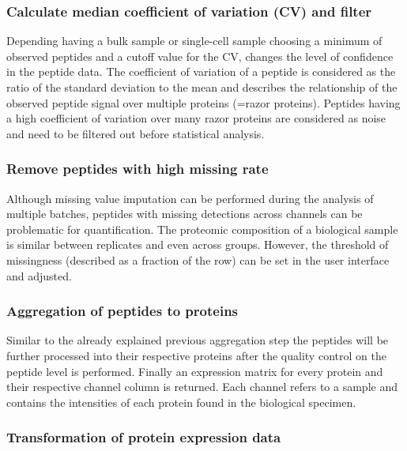 \documentclass[
  11pt,
]{article}
\begin{document}
\hypertarget{calculate-median-coefficient-of-variation-cv-and-filter}{%
\subsubsection{Calculate median coefficient of variation (CV) and
filter}\label{calculate-median-coefficient-of-variation-cv-and-filter}}

Depending having a bulk sample or single-cell sample choosing a minimum
of observed peptides and a cutoff value for the CV, changes the level of
confidence in the peptide data. The coefficient of variation of a
peptide is considered as the ratio of the standard deviation to the mean
and describes the relationship of the observed peptide signal over
multiple proteins (=razor proteins). Peptides having a high coefficient
of variation over many razor proteins are considered as noise and need
to be filtered out before statistical analysis.

\hypertarget{remove-peptides-with-high-missing-rate}{%
\subsubsection{Remove peptides with high missing
rate}\label{remove-peptides-with-high-missing-rate}}

Although missing value imputation can be performed during the analysis
of multiple batches, peptides with missing detections across channels
can be problematic for quantification. The proteomic composition of a
biological sample is similar between replicates and even across groups.
However, the threshold of missingness (described as a fraction of the
row) can be set in the user interface and adjusted.

\hypertarget{aggregation-of-peptides-to-proteins}{%
\subsubsection{Aggregation of peptides to
proteins}\label{aggregation-of-peptides-to-proteins}}

Similar to the already explained previous aggregation step the peptides
will be further processed into their respective proteins after the
quality control on the peptide level is performed. Finally an expression
matrix for every protein and their respective channel column is
returned. Each channel refers to a sample and contains the intensities
of each protein found in the biological specimen.

\hypertarget{transformation-of-protein-expression-data}{%
\subsubsection{Transformation of protein expression
data}\label{transformation-of-protein-expression-data}}
\end{document}
